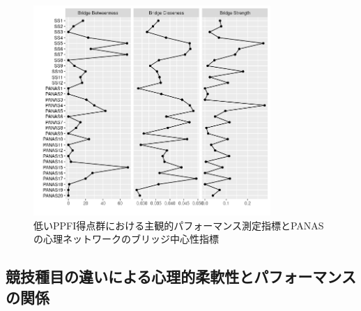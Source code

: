 \documentclass[12pt,a4paper,xelatex,ja=standard]{bxjsarticle}
\begin{document}
\begin{figure}[H]
\centering
\includegraphics[clip,width = 9cm]{Low_B.png}
\caption{低いPPFI得点群における主観的パフォーマンス測定指標とPANASの心理ネットワークのブリッジ中心性指標}
\end{figure}

\hypertarget{ux7af6ux6280ux7a2eux76eeux306eux9055ux3044ux306bux3088ux308bux5fc3ux7406ux7684ux67d4ux8edfux6027ux3068ux30d1ux30d5ux30a9ux30fcux30deux30f3ux30b9ux306eux95a2ux4fc2}{%
\subsection{競技種目の違いによる心理的柔軟性とパフォーマンスの関係}\label{ux7af6ux6280ux7a2eux76eeux306eux9055ux3044ux306bux3088ux308bux5fc3ux7406ux7684ux67d4ux8edfux6027ux3068ux30d1ux30d5ux30a9ux30fcux30deux30f3ux30b9ux306eux95a2ux4fc2}}
\end{document}
